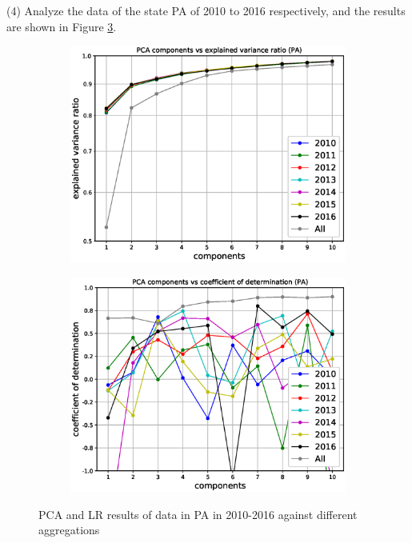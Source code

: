 \documentclass{mcmthesis}
\begin{document}
(4) Analyze the data of the state PA of 2010 to 2016 respectively, and the results are shown in Figure \ref{fig:pca_year_PA}.
    \begin{figure}[H]
    \centering
    \begin{subfigure}[b]{0.48\textwidth}
        \includegraphics[width=\textwidth]{../figure/pca_year_PA_ratio.eps}
        \label{fig:pca_year_PA_ratio}
    \end{subfigure}\hfill
    \begin{subfigure}[b]{0.48\textwidth}
        \includegraphics[width=\textwidth]{../figure/pca_year_PA_score.eps}
        \label{fig:pca_year_PA_score}
    \end{subfigure}
    \caption{PCA and LR results of data in PA in 2010-2016 against different aggregations}\label{fig:pca_year_PA}
\end{figure}
\end{document}
